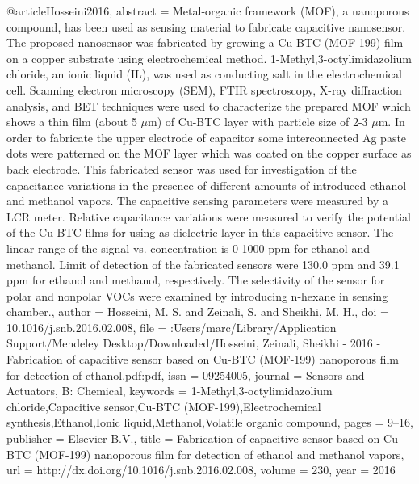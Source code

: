 @article{Hosseini2016,
abstract = {Metal-organic framework (MOF), a nanoporous compound, has been used as sensing material to fabricate capacitive nanosensor. The proposed nanosensor was fabricated by growing a Cu-BTC (MOF-199) film on a copper substrate using electrochemical method. 1-Methyl,3-octylimidazolium chloride, an ionic liquid (IL), was used as conducting salt in the electrochemical cell. Scanning electron microscopy (SEM), FTIR spectroscopy, X-ray diffraction analysis, and BET techniques were used to characterize the prepared MOF which shows a thin film (about 5 $\mu$m) of Cu-BTC layer with particle size of 2-3 $\mu$m. In order to fabricate the upper electrode of capacitor some interconnected Ag paste dots were patterned on the MOF layer which was coated on the copper surface as back electrode. This fabricated sensor was used for investigation of the capacitance variations in the presence of different amounts of introduced ethanol and methanol vapors. The capacitive sensing parameters were measured by a LCR meter. Relative capacitance variations were measured to verify the potential of the Cu-BTC films for using as dielectric layer in this capacitive sensor. The linear range of the signal vs. concentration is 0-1000 ppm for ethanol and methanol. Limit of detection of the fabricated sensors were 130.0 ppm and 39.1 ppm for ethanol and methanol, respectively. The selectivity of the sensor for polar and nonpolar VOCs were examined by introducing n-hexane in sensing chamber.},
author = {Hosseini, M. S. and Zeinali, S. and Sheikhi, M. H.},
doi = {10.1016/j.snb.2016.02.008},
file = {:Users/marc/Library/Application Support/Mendeley Desktop/Downloaded/Hosseini, Zeinali, Sheikhi - 2016 - Fabrication of capacitive sensor based on Cu-BTC (MOF-199) nanoporous film for detection of ethanol.pdf:pdf},
issn = {09254005},
journal = {Sensors and Actuators, B: Chemical},
keywords = {1-Methyl,3-octylimidazolium chloride,Capacitive sensor,Cu-BTC (MOF-199),Electrochemical synthesis,Ethanol,Ionic liquid,Methanol,Volatile organic compound},
pages = {9--16},
publisher = {Elsevier B.V.},
title = {{Fabrication of capacitive sensor based on Cu-BTC (MOF-199) nanoporous film for detection of ethanol and methanol vapors}},
url = {http://dx.doi.org/10.1016/j.snb.2016.02.008},
volume = {230},
year = {2016}
}
